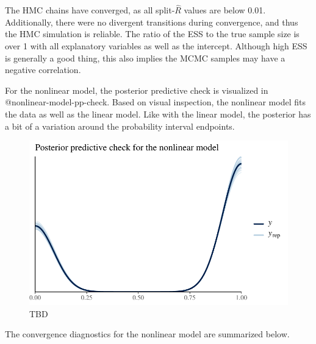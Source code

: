 \documentclass[
  letterpaper,
  DIV=11,
  numbers=noendperiod]{scrartcl}
\begin{document}
The HMC chains have converged, as all split-\(\hat{R}\) values are below
0.01. Additionally, there were no divergent transitions during
convergence, and thus the HMC simulation is reliable. The ratio of the
ESS to the true sample size is over 1 with all explanatory variables as
well as the intercept. Although high ESS is generally a good thing, this
also implies the MCMC samples may have a negative correlation.

For the nonlinear model, the posterior predictive check is visualized in
@nonlinear-model-pp-check. Based on visual inspection, the nonlinear
model fits the data as well as the linear model. Like with the linear
model, the posterior has a bit of a variation around the probability
interval endpoints.

\begin{figure}

{\centering \includegraphics{project_final_files/figure-pdf/nonlinear-model-pp-check-1.pdf}

}

\caption{TBD}

\end{figure}

The convergence diagnostics for the nonlinear model are summarized
below.
\end{document}
